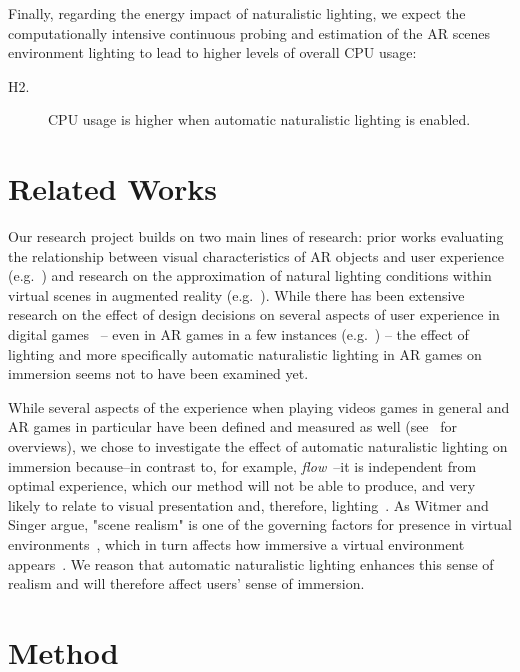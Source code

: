 \documentclass[12pt,twoside,english]{article}
\begin{document}
Finally, regarding the energy impact of naturalistic lighting, we expect the computationally intensive continuous probing and estimation of the \gls{AR} scenes environment lighting to lead to higher levels of overall \gls{CPU} usage:

\begin{description}
    \item[H2.] \gls{CPU} usage is higher when automatic naturalistic lighting is enabled.
\end{description}


\section{Related Works}
\label{sect:related_works}

Our research project builds on two main lines of research: prior works evaluating the relationship between visual characteristics of \gls{AR} objects and user experience (e.g.~\cite{gabbard_effects_2006}) and research on the approximation of natural lighting conditions within virtual scenes in augmented reality (e.g.~\cite{aittala_inverse_2010}).
While there has been extensive research on the effect of design decisions on several aspects of user experience in digital games~\cite{johnson_validation_2018} -- even in \gls{AR} games in a few instances (e.g.~\cite{georgiou_development_2017}) -- the effect of lighting and more specifically automatic naturalistic lighting in \gls{AR} games on immersion seems not to have been examined yet.

While several aspects of the experience when playing videos games in general and \gls{AR} games in particular have been defined and measured as well (see~\cite{dey_systematic_2018, dunser_survey_2008} for overviews), we chose to investigate the effect of automatic naturalistic lighting on immersion because--in contrast to, for example, \textit{flow}~\cite{csikszentmihalyi_flow_1990}--it is independent from optimal experience, which our method will not be able to produce, and very likely to relate to visual presentation and, therefore, lighting~\cite{jennett_measuring_2008}.
As Witmer and Singer argue, "scene realism" is one of the governing factors for presence in virtual environments~\cite{witmer_measuring_1998}, which in turn affects how immersive a virtual environment appears~\cite{jennett_measuring_2008}.
We reason that automatic naturalistic lighting enhances this sense of realism and will therefore affect users' sense of immersion.


\section{Method}
\label{sect:method}
\end{document}
